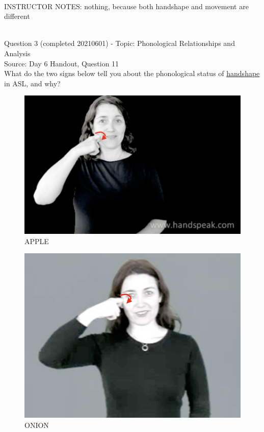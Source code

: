 \documentclass[12pt]{article}
\begin{document}
~\\
INSTRUCTOR NOTES: nothing, because both handshape and movement are different


~\\

{\large Question 3} (completed 20210601) - Topic: Phonological Relationships and Analysis\\
Source: Day 6 Handout, Question 11\\

What do the two signs below tell you about the phonological status of \underline{handshape} in ASL, and why?\\

\begin{figure}[H]
\includegraphics{../images/asl_apple.png}
\caption{APPLE}
\end{figure}
\begin{figure}[H]
\includegraphics{../images/asl_onion.png}
\caption{ONION}
\end{figure}
\end{document}
